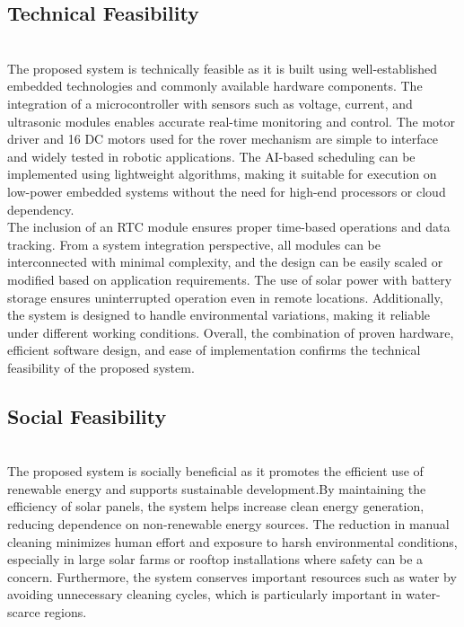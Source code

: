 \documentclass[10pt]{report}
\begin{document}
\begin{sloppypar}
{{{\begin{sloppypar}
\subsection{Technical Feasibility}\\
\hspace{0.5cm}
The proposed system is technically feasible as it is built using well-established
embedded technologies and commonly available hardware components. The integration of a microcontroller with sensors such as voltage, current, and ultrasonic
modules enables accurate real-time monitoring and control. The motor driver and
16
DC motors used for the rover mechanism are simple to interface and widely tested in
robotic applications. The AI-based scheduling can be implemented using lightweight
algorithms, making it suitable for execution on low-power embedded systems without the need for high-end processors or cloud dependency. \\

The inclusion of an RTC
module ensures proper time-based operations and data tracking. From a system integration perspective, all modules can be interconnected with minimal complexity,
and the design can be easily scaled or modified based on application requirements.
The use of solar power with battery storage ensures uninterrupted operation even
in remote locations. Additionally, the system is designed to handle environmental
variations, making it reliable under different working conditions. Overall, the combination of proven hardware, efficient software design, and ease of implementation
confirms the technical feasibility of the proposed system.

\subsection{Social Feasibility}
\\
\hspace{0.5cm}
The proposed system is socially beneficial as it promotes the efficient use of
renewable energy and supports sustainable development.By maintaining the efficiency of solar panels, the system helps increase clean energy generation, reducing
dependence on non-renewable energy sources. The reduction in manual cleaning
minimizes human effort and exposure to harsh environmental conditions, especially
in large solar farms or rooftop installations where safety can be a concern. Furthermore, the system conserves important resources such as water by avoiding unnecessary cleaning cycles, which is particularly important in water-scarce regions.
\\


\end{sloppypar}}}}
\end{sloppypar}
\end{document}
